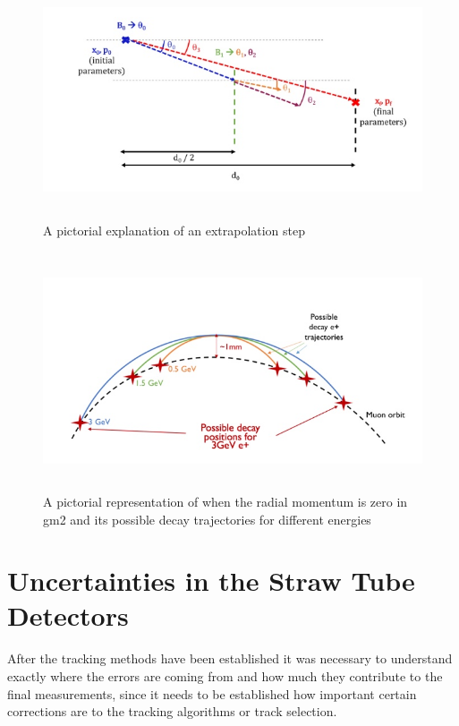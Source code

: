 \documentclass[./Thesis]{subfiles}
\begin{document}
\begin{figure}
	\centerline{\includegraphics[height=70mm]{ExtrapStep.jpeg}}
	\caption[An Extrapolation Step]{ A pictorial explanation of an extrapolation step	\cite{Sask}}
	\label{fig:extrapstep}
\end{figure} 


\begin{figure}
	\centerline{\includegraphics[height=70mm]{ParRing.jpeg}}
	\caption[Radial Momentum zero]{ A pictorial representation of when the radial momentum is zero in gm2 and its possible decay trajectories for different energies \cite{Sask}}
	\label{fig:parring}
\end{figure} 


	
	
\section{Uncertainties in the Straw Tube Detectors}

After the tracking methods have been established it was necessary to understand exactly where the errors are coming from and how much they contribute to the final measurements, since it needs to be established how important certain corrections are to the tracking algorithms or track selection. 
\end{document}
